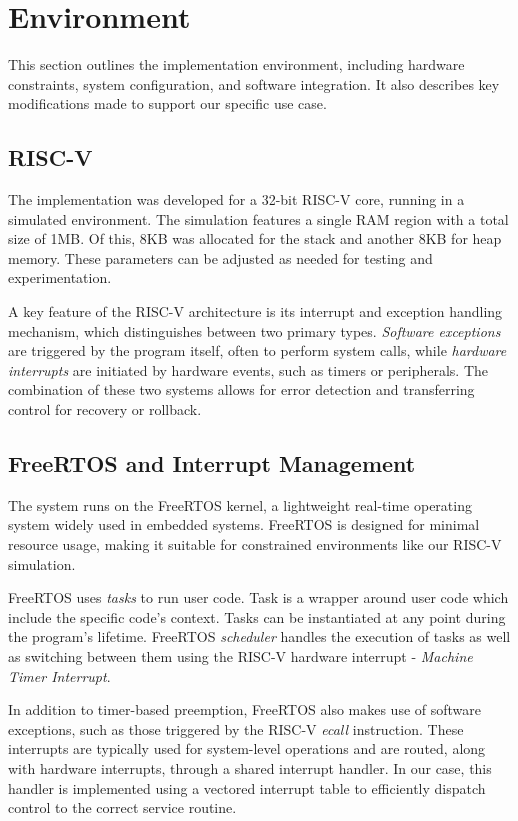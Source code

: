 \section{Environment}

This section outlines the implementation environment, including hardware constraints, system configuration, and software integration. It also describes key modifications made to support our specific use case.

\subsection{RISC-V}

The implementation was developed for a 32-bit RISC-V core, running in a simulated environment. The simulation features a single RAM region with a total size of 1MB. Of this, 8KB was allocated for the stack and another 8KB for heap memory. These parameters can be adjusted as needed for testing and experimentation.

A key feature of the RISC-V architecture is its interrupt and exception handling mechanism, which distinguishes between two primary types. \textit{Software exceptions} are triggered by the program itself, often to perform system calls, while \textit{hardware interrupts} are initiated by hardware events, such as timers or peripherals. The combination of these two systems allows for error detection and transferring control for recovery or rollback.

\subsection{FreeRTOS and Interrupt Management}

The system runs on the FreeRTOS kernel, a lightweight real-time operating system widely used in embedded systems. FreeRTOS is designed for minimal resource usage, making it suitable for constrained environments like our RISC-V simulation.

FreeRTOS uses \textit{tasks} to run user code. Task is a wrapper around user code which include the specific code's context. Tasks can be instantiated at any point during the program's lifetime. FreeRTOS \textit{scheduler} handles the execution of tasks as well as switching between them using the RISC-V hardware interrupt - \textit{Machine Timer Interrupt}.

In addition to timer-based preemption, FreeRTOS also makes use of software exceptions, such as those triggered by the RISC-V \textit{ecall} instruction. These interrupts are typically used for system-level operations and are routed, along with hardware interrupts, through a shared interrupt handler. In our case, this handler is implemented using a vectored interrupt table to efficiently dispatch control to the correct service routine.

